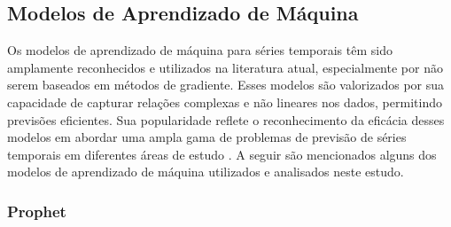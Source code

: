 % 
%
% 
% 
 
 \subsection{Modelos de Aprendizado de M\'aquina}\label{subsec:reg}
 
 Os modelos de aprendizado de máquina para séries temporais têm sido amplamente reconhecidos e utilizados na literatura atual, especialmente por não serem baseados em métodos de gradiente. Esses modelos são valorizados por sua capacidade de capturar relações complexas e não lineares nos dados, permitindo previsões eficientes. Sua popularidade reflete o reconhecimento da eficácia desses modelos em abordar uma ampla gama de problemas de previsão de séries temporais em diferentes áreas de estudo \cite{al2021machine, sen2022machine, kheiri2023sentimentgpt}. A seguir são mencionados alguns dos modelos de aprendizado de máquina utilizados e analisados neste estudo.
 
  \subsubsection{Prophet}
 
